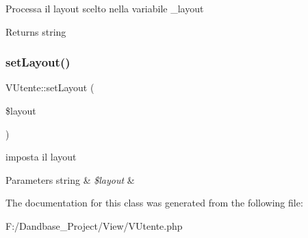 Processa il layout scelto nella variabile \+\_\+layout

\begin{DoxyReturn}{Returns}
string 
\end{DoxyReturn}
\mbox{\label{class_v_utente_ae30bdda632dfa1f36c4da8bc801bdba1}} 
\subsubsection{\texorpdfstring{set\+Layout()}{setLayout()}}
{\footnotesize\ttfamily V\+Utente\+::set\+Layout (\begin{DoxyParamCaption}\item[{}]{\$layout }\end{DoxyParamCaption})}

imposta il layout


\begin{DoxyParams}[1]{Parameters}
string & {\em \$layout} & \\
\hline
\end{DoxyParams}


The documentation for this class was generated from the following file\+:\begin{DoxyCompactItemize}
\item 
F\+:/\+Dandbase\+\_\+\+Project/\+View/V\+Utente.\+php\end{DoxyCompactItemize}
